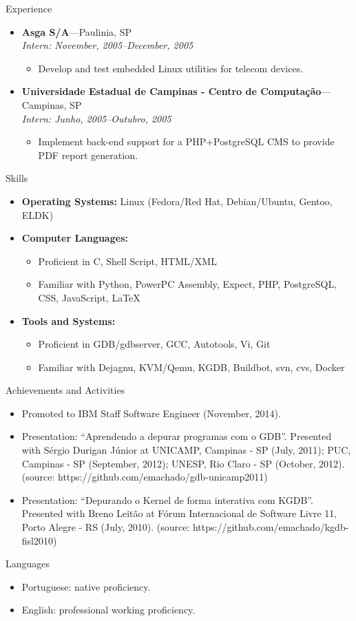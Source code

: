 \documentclass[11pt,oneside]{article}
\newenvironment{ressection}[1]{
	\vspace{4pt}
	{\selectfont\Large#1}
	\begin{itemize}
	\vspace{3pt}
}{
	\end{itemize}
}
\newcommand{\resitem}[1]{
	\vspace{-4pt}
	\item \begin{flushleft} #1 \end{flushleft}
}
\newcommand{\ressubitem}[1]{
	\vspace{-1pt}
	\item \begin{flushleft} #1 \end{flushleft}
}
\newcommand{\resbigitem}[3]{
	\vspace{-5pt}
	\item
	\textbf{#1}---#2 \\
	\textit{#3}
}
\newenvironment{ressubsec}[3]{
	\resbigitem{#1}{#2}{#3}
	\vspace{-2pt}
	\begin{itemize}
}{
	\end{itemize}
}
\newenvironment{reslist}[1]{
	\resitem{\textbf{#1}}
	\vspace{-5pt}
	\begin{itemize}
}{
	\end{itemize}
}
\begin{document}
\begin{ressection}{Experience}
	\begin{ressubsec}{Asga S/A}{Paulinia, SP}{Intern: November, 2005--December, 2005}

		\ressubitem{Develop and test embedded Linux utilities for
		telecom devices.}

	\end{ressubsec}

	\begin{ressubsec}{Universidade Estadual de Campinas - Centro de Computação}{Campinas, SP}{Intern: Junho, 2005--Outubro, 2005}

		\ressubitem{Implement back-end support for a PHP+PostgreSQL CMS
		to provide PDF report generation.}

	\end{ressubsec}

\end{ressection}


\begin{ressection}{Skills}

  \resitem{\textbf{Operating Systems:} Linux (Fedora/Red Hat, Debian/Ubuntu, Gentoo, ELDK)}

	\begin{reslist}{Computer Languages:}

		\ressubitem{Proficient in C, Shell Script, HTML/XML}

		\ressubitem{Familiar with Python, PowerPC Assembly, Expect, PHP, PostgreSQL, CSS, JavaScript, \LaTeX}

	\end{reslist}

	\begin{reslist}{Tools and Systems:}

		\ressubitem{Proficient in GDB/gdbserver, GCC, Autotools, Vi, Git}

		\ressubitem{Familiar with Dejagnu, KVM/Qemu, KGDB, Buildbot, svn, cvs, Docker}

	\end{reslist}


\end{ressection}


\begin{ressection}{Achievements and Activities}

	\resitem{Promoted to IBM Staff Software Engineer (November, 2014).}

	\resitem{Presentation: ``Aprendendo a depurar programas com o GDB''.
	Presented with Sérgio Durigan Júnior at UNICAMP, Campinas - SP (July, 2011);
	PUC, Campinas - SP (September, 2012);
	UNESP, Rio Claro - SP (October, 2012).
	(source: https://github.com/emachado/gdb-unicamp2011)}

	\resitem{Presentation: ``Depurando o Kernel de forma interativa com KGDB''.
	Presented with Breno Leitão at Fórum Internacional de Software Livre 11, Porto Alegre - RS (July, 2010).
	(source: https://github.com/emachado/kgdb-fisl2010)}

\end{ressection}

\begin{ressection}{Languages}

	\resitem{Portuguese: native proficiency.}
	\resitem{English: professional working proficiency.}

\end{ressection}
\end{document}
